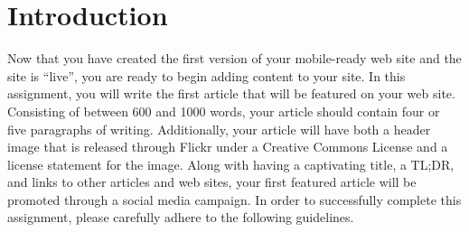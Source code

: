 

\usepackage[compact]{titlesec}




\vspace*{-.2in}
\section*{Introduction}

Now that you have created the first version of your mobile-ready web site and the site is ``live'', you are ready to
begin adding content to your site. In this assignment, you will write the first article that will be featured on your
web site. Consisting of between 600 and 1000 words, your article should contain four or five paragraphs of writing.
Additionally, your article will have both a header image that is released through Flickr under a Creative Commons
License and a license statement for the image. Along with having a captivating title, a TL;DR, and links to other
articles and web sites, your first featured article will be promoted through a social media campaign. In order to
successfully complete this assignment, please carefully adhere to the following guidelines.

